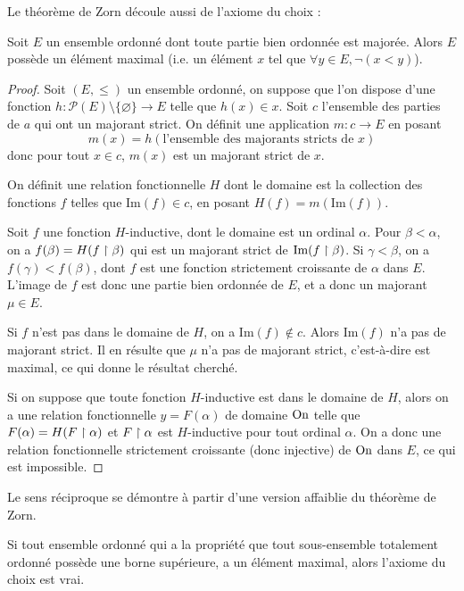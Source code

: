 Le théorème de Zorn découle aussi de l'axiome du choix :

\begin{them}[Zorn]
    Soit $E$ un ensemble ordonné dont toute partie bien ordonnée est majorée. Alors $E$ possède un élément maximal (i.e. un élément $x$ tel que $\forall y\in E, \lnot (x < y)$).
\end{them}

\begin{proof}
    Soit $(E,\leq)$ un ensemble ordonné, on suppose que l'on dispose d'une fonction $h : \mathcal P(E)\setminus\{\varnothing\}\to E$ telle que $h(x)\in x$. Soit $c$ l'ensemble des parties de $a$ qui ont un majorant strict. On définit une application $m : c \to E$ en posant $$m(x) = h(\text{l'ensemble des majorants stricts de } x)$$ donc pour tout $x\in c$, $m(x)$ est un majorant strict de $x$.

    On définit une relation fonctionnelle $H$ dont le domaine est la collection des fonctions $f$ telles que $\mathrm{Im}(f)\in c$, en posant $H(f) = m(\mathrm{Im}(f))$.

    Soit $f$ une fonction $H$-inductive, dont le domaine est un ordinal $\alpha$. Pour $\beta < \alpha$, on a $f(\beta) = H(f\upharpoonright\beta)$ qui est un majorant strict de $\mathrm{Im}(f\upharpoonright\beta)$. Si $\gamma < \beta$, on a $f(\gamma) < f(\beta)$, dont $f$ est une fonction strictement croissante de $\alpha$ dans $E$. L'image de $f$ est donc une partie bien ordonnée de $E$, et a donc un majorant $\mu\in E$.

    Si $f$ n'est pas dans le domaine de $H$, on a $\mathrm{Im}(f)\notin c$. Alors $\mathrm{Im}(f)$ n'a pas de majorant strict. Il en résulte que $\mu$ n'a pas de majorant strict, c'est-à-dire est maximal, ce qui donne le résultat cherché.

    Si on suppose que toute fonction $H$-inductive est dans le domaine de $H$, alors on a une relation fonctionnelle $y = F(\alpha)$ de domaine $\mathrm{On}$ telle que $F(\alpha) = H(F\upharpoonright\alpha)$ et $F\upharpoonright\alpha$ est $H$-inductive pour tout ordinal $\alpha$. On a donc une relation fonctionnelle strictement croissante (donc injective) de $\mathrm{On}$ dans $E$, ce qui est impossible.
\end{proof}

Le sens réciproque se démontre à partir d'une version affaiblie du théorème de Zorn.

\begin{prop}
    Si tout ensemble ordonné qui a la propriété que tout sous-ensemble totalement ordonné possède une borne supérieure, a un élément maximal, alors l'axiome du choix est vrai.
\end{prop}

